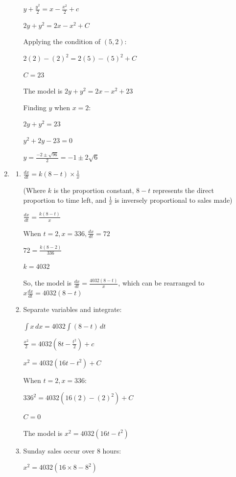\documentclass[../main.tex]{subfiles}
\begin{document}
\begin{spacing}{1.5}
\begin{enumerate}[itemsep=0.7cm]
\begin{enumerate}[itemsep=0.7cm]
        $y+\frac{y^2}{2}=x-\frac{x^2}{2}+c$

        $2y+y^2=2x-x^2+C$

        Applying the condition of $(5,2)$:

        $2(2)-(2)^2=2(5)-(5)^2+C$

        $C=23$

        The model is $2y+y^2=2x-x^2+23$

        Finding $y$ when $x=2$:

        $2y+y^2=23$

        $y^2+2y-23=0$

        $y=\frac{-2 \pm \sqrt{96}}{2}=-1 \pm 2\sqrt{6}$
    
    \end{enumerate}

    \item 
    \begin{enumerate}[itemsep=0.7cm]
        \item 
        $\frac{dx}{dt}=k(8-t)\times \frac{1}{x}$

        (Where $k$ is the proportion constant, $8-t$ represents the direct proportion to time left, and $\frac{1}{x}$ is inversely proportional to sales made)
   
        $\frac{dx}{dt}=\frac{k(8-t)}{x}$

        When $t=2, x=336, \frac{dx}{dt}=72$

        $72=\frac{k(8-2)}{336}$

        $k=4032$

        So, the model is $\frac{dx}{dt}=\frac{4032(8-t)}{x}$, which can be rearranged to $x\frac{dx}{dt}=4032(8-t)$

        \item 
        Separate variables and integrate:

        $\int x\,dx=4032\int (8-t)\,dt$

        $\frac{x^2}{2}=4032(8t-\frac{t^2}{2})+c$

        $x^2=4032(16t-t^2)+C$

        When $t=2, x=336$:

        $336^2=4032(16(2)-(2)^2)+C$

        $C=0$

        The model is $x^2=4032(16t-t^2)$

        \item 
        Sunday sales occur over 8 hours:

        $x^2=4032(16\times 8 - 8^2)$


\end{enumerate}
\end{enumerate}
\end{spacing}
\end{document}
